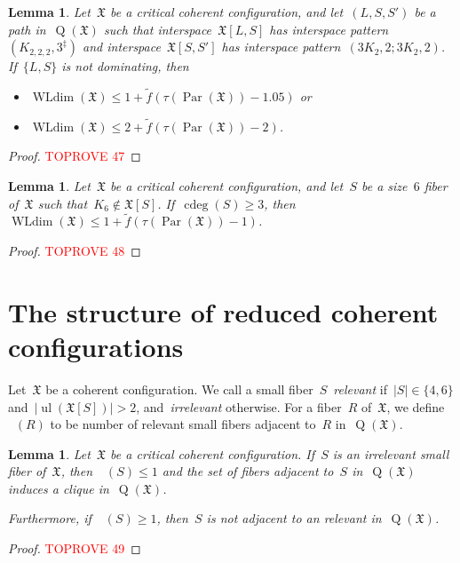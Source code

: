 \documentclass[english,a4paper]{article}
\theoremstyle{plain}
\newtheorem{lemma}      [theorem]{Lemma}
\theoremstyle{definition}
\newcommand{\coherentConfig}{\ensuremath{\mathfrak{X}}}
\newcommand{\interspace}[2]{\ensuremath{\coherentConfig[#1,#2]}}
\newcommand{\inducedCC}[1]{\ensuremath{\coherentConfig[#1]}}
\DeclareMathOperator*{\ul}{ul}
\DeclareMathOperator*{\WLdim}{WLdim}
\newcommand{\wldim}[1]{\ensuremath{\WLdim\left(#1\right)}}
\DeclareMathOperator*{\Quotient}{Q}
\newcommand{\quotientGraph}[1]{\ensuremath{\Quotient(#1)}}
\DeclareMathOperator{\ColorDeg}{cdeg}
\DeclareMathOperator{\ColorDegLarge}{cdeg_L}
\DeclareMathOperator{\ColorDegSmall}{cdeg_S}
\DeclareMathOperator{\ColorDegRelevantSmall}{cdeg_{rS}}
\newcommand{\colorDeg}[1]{\ensuremath{\ColorDeg\left(#1\right)}}
\newcommand{\colorDegLarge}[1]{\ensuremath{\ColorDegLarge\left(#1\right)}}
\newcommand{\colorDegSmall}[1]{\ensuremath{\ColorDegSmall\left(#1\right)}}
\newcommand{\colorDegRelevantSmall}[1]{\ensuremath{\ColorDegRelevantSmall\left(#1\right)}}
\newcommand{\f}{f}
\DeclareMathOperator{\parameters}{Par}
\newcommand{\ipsixMatchingMatching}     {\ensuremath{(\disjointCliques{3}{2},2;\disjointCliques{3}{2},2)}}
\newcommand{\ipsixMatchingComplementD}{\ensuremath{(\clique{2,2,2},3^\ddag)}}
\newcommand{\clique}[1]{\ensuremath{K_{#1}}}
\newcommand{\disjointCliques}[2]{\ensuremath{#1 \clique{#2}}}
\begin{document}
\begin{lemma}
\label{local:alternating-6cycle/lem}
    Let~$\coherentConfig$ be a critical coherent configuration, and let~$(L,S,S')$ be a path in~$\quotientGraph{\coherentConfig}$ such that interspace~$\interspace{L}{S}$ has interspace pattern~$\ipsixMatchingComplementD$ and interspace~$\interspace{S}{S'}$ has interspace pattern~$\ipsixMatchingMatching$.
    If~$\{L,S\}$ is not dominating, then
    \begin{itemize}
        \item $\wldim{\coherentConfig} \leq 1 + \widetilde{\f}( \tau(\parameters(\coherentConfig)) - 1.05)$ or
        \item $\wldim{\coherentConfig} \leq 2 + \widetilde{\f}( \tau(\parameters(\coherentConfig)) - 2)$.
    \end{itemize}
\end{lemma}
\begin{proof}\textcolor{red}{TOPROVE 47}\end{proof}










\begin{lemma}
\label{local:6cc:3neighbors/lem}
    Let~$\coherentConfig$ be a critical coherent configuration, and let~$S$ be a size~$6$ fiber of~$\coherentConfig$  such that~$\clique{6} \notin\inducedCC{S}$.
    If~$\colorDeg{S} \geq 3$, then~$\wldim{\coherentConfig} \leq 1 + \widetilde{\f}( \tau(\parameters(\coherentConfig)) - 1  )$.
\end{lemma}
\begin{proof}\textcolor{red}{TOPROVE 48}\end{proof}

     


\section{The structure of reduced coherent configurations}
\label{structure-reduced-cc/sec}

Let~$\coherentConfig$ be a coherent configuration.
We call a small fiber~$S$~\emph{relevant} if~$|S| \in \{4,6\}$ and~$|\ul(\inducedCC{S})| > 2$, and~\emph{irrelevant} otherwise.
For a fiber~$R$ of~$\coherentConfig$, we define~$\colorDegRelevantSmall{R}$ to be number of relevant small fibers adjacent to~$R$ in~$\quotientGraph{\coherentConfig}$.


\begin{lemma}
\label{irrelevant-small-fibers/lem}
    Let~$\coherentConfig$ be a critical coherent configuration.
    If~$S$ is an irrelevant small fiber of~$\coherentConfig$,
    then~$\colorDegSmall{S} \leq 1$ and the set of fibers adjacent to~$S$ in~$\quotientGraph{\coherentConfig}$ induces a clique in~$\quotientGraph{\coherentConfig}$.

    Furthermore, if~$\colorDegLarge{S} \geq 1$, then~$S$ is not adjacent to an relevant in~$\quotientGraph{\coherentConfig}$.
\end{lemma}
\begin{proof}\textcolor{red}{TOPROVE 49}\end{proof}
\end{document}

